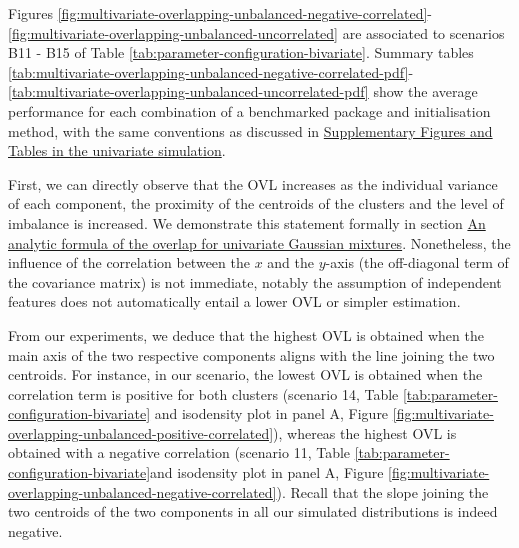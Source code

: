 Figures \ref{fig:multivariate-overlapping-unbalanced-negative-correlated}-
\ref{fig:multivariate-overlapping-unbalanced-uncorrelated} are associated to scenarios B11 - B15 of Table \ref{tab:parameter-configuration-bivariate}. Summary tables
\ref{tab:multivariate-overlapping-unbalanced-negative-correlated-pdf}-\ref{tab:multivariate-overlapping-unbalanced-uncorrelated-pdf}
show the average performance for each combination of a benchmarked package and initialisation method, with the same conventions as discussed in \protect\hyperlink{supplementary-figures-and-tables-in-the-univariate-simulation}{Supplementary Figures and Tables in the univariate simulation}.

First, we can directly observe that the OVL increases as the individual variance of each component, the proximity of the centroids of the clusters and the level of imbalance is increased. We demonstrate this statement formally in section \protect\hyperlink{an-analytic-formula-of-the-overlap-for-univariate-gaussian-mixtures}{An analytic formula of the overlap for univariate Gaussian mixtures}. Nonetheless, the influence of the correlation between the \(x\) and the \(y\)-axis (the off-diagonal term of the covariance matrix) is not immediate, notably the assumption of independent features does not automatically entail a lower OVL or simpler estimation.

From our experiments, we deduce that the highest OVL is obtained when the main axis of the two respective components aligns with the line joining the two centroids. For instance, in our scenario, the lowest OVL is obtained when the correlation term is positive for both clusters (scenario 14, Table \ref{tab:parameter-configuration-bivariate} and isodensity plot in panel A, Figure \ref{fig:multivariate-overlapping-unbalanced-positive-correlated}), whereas the highest OVL is obtained with a negative correlation (scenario 11, Table \ref{tab:parameter-configuration-bivariate}and isodensity plot in panel A, Figure \ref{fig:multivariate-overlapping-unbalanced-negative-correlated}). Recall that the slope joining the two centroids of the two components in all our simulated distributions is indeed negative.

